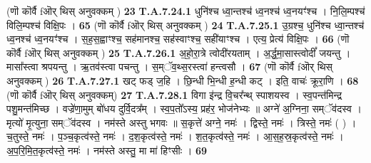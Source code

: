 \documentclass[17pt]{extarticle}
\begin{document}
{                                                        (णॊ कॊर्वै fऒर् थिस् अनुवक्कम् ) \textbf{23} \newline \newline
                                \textbf{ T.A.7.24.1} \newline
                  धुनि॑श्च ध्वा॒न्तश्च॑ ध्व॒नश्च॑ ध्व॒नयꣳ॑श्च ।  नि॒लि॒म्पश्च॑ विलि॒म्पश्च॑ विक्षि॒पः । \textbf{ 65} \newline
                  \newline
                                                        (णॊ कॊर्वै fऒर् थिस् अनुवक्कम् ) \textbf{24} \newline \newline
                                \textbf{ T.A.7.25.1} \newline
                  उ॒ग्रश्च॒ धुनि॑श्च ध्वा॒न्तश्च॑ ध्व॒नश्च॑ ध्व॒नयꣳ॑श्च । स॒ह॒स॒ह्वाꣳश्च॒ सह॑मानश्च॒ सह॑स्वाꣳश्च॒ सही॑याꣳश्च ।  एत्य॒ प्रेत्य॑ विक्षि॒पः । \textbf{ 66} \newline
                  \newline
                                                        (णॊ कॊर्वै fऒर् थिस् अनुवक्कम् ) \textbf{25} \newline \newline
                                \textbf{ T.A.7.26.1} \newline
                  अ॒हो॒रा॒त्रे त्वोदी॑रयताम् । अ॒र्द्ध॒मा॒सास्त्वोदीं᳚ जयन्तु । मासा᳚स्त्वा श्रपयन्तु । ऋ॒तव॑स्त्वा पचन्तु ।  स॒म्ॅव॒थ्स॒रस्त्वा॑ हन्त्वसौ । \textbf{ 67} \newline
                  \newline
                                                        (णॊ कॊर्वै fऒर् थिस् अनुवक्कम् ) \textbf{26} \newline \newline
                                \textbf{ T.A.7.27.1} \newline
                  खट् फड् ज॒हि । छि॒न्धी भि॒न्धी ह॒न्धी कट् ।  इति॒ वाचः॑ क्रूरा॒णि । \textbf{ 68} \newline
                  \newline
                                                        (णॊ कॊर्वै fऒर् थिस् अनुवक्कम्) \textbf{27} \newline \newline
                                \textbf{ T.A.7.28.1} \newline
                  विगा इ॑न्द्र वि॒चर᳚न्थ् स्पाशयस्व । स्व॒पन्त॑मिन्द्र पशु॒मन्त॑मिच्छ । वज्रे॑णा॒मुम् बो॑धय दुर्वि॒दत्र᳚म् । स्व॒प॒तो᳚ऽस्य॒ प्रह॑र॒ भोज॑नेभ्यः ॥  अग्ने॑ अ॒ग्निना॒ सम्ॅव॑दस्व । मृत्यो॑ मृ॒त्युना॒ सम्ॅव॑दस्व । नम॑स्ते अस्तु भगवः ॥ स॒कृत्ते॑ अग्ने॒ नमः॑ । द्विस्ते॒ नमः॑ । त्रिस्ते॒ नमः॑ ( ) । च॒तुस्ते॒ नमः॑ । प॒ञ्च॒कृत्व॑स्ते॒ नमः॑ ।  द॒श॒कृत्व॑स्ते॒ नमः॑ । श॒त॒कृत्व॑स्ते॒ नमः॑ । आ॒स॒ह॒स्र॒कृत्व॑स्ते॒ नमः॑ । अ॒प॒रि॒मि॒त॒कृत्व॑स्ते॒ नमः॑ । नम॑स्ते अस्तु॒ मा मा॑ हिꣳसीः । \textbf{ 69} \newline
}
\end{document}
